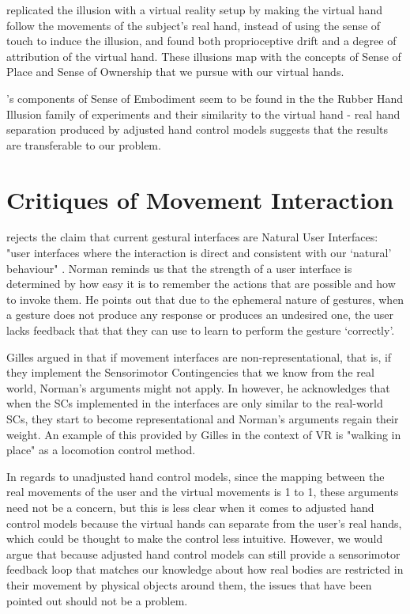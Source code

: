 \parencite{Sanchez-Vives2010} replicated the illusion with a virtual reality setup by making the virtual hand follow the movements of the subject's real hand, instead of using the sense of touch to induce the illusion, and found both proprioceptive drift and a degree of attribution of the virtual hand. These illusions map with the concepts of Sense of Place and Sense of Ownership that we pursue with our virtual hands.

\parencite{Kilteni2012}'s components of Sense of Embodiment seem to be found in the the Rubber Hand Illusion family of experiments and their similarity to the virtual hand - real hand separation produced by adjusted hand control models suggests that the results are transferable to our problem.

\section{Critiques of Movement Interaction}
\label{sec:critiquesMovementInteraction}

\parencite{Norman2010} rejects the claim that current gestural interfaces are Natural User Interfaces: "user interfaces where the interaction is direct and consistent with our ‘natural’ behaviour" \parencite{HvasMortensen2017}. Norman reminds us that the strength of a user interface is determined by how easy it is to remember the actions that are possible and how to invoke them. He points out that due to the ephemeral nature of gestures, when a gesture does not produce any response or produces an undesired one, the user lacks feedback that that they can use to learn to perform the gesture ‘correctly’.

Gilles argued in \parencite{Gillies2014} that if movement interfaces are non-representational, that is, if they implement the Sensorimotor Contingencies that we know from the real world, Norman's arguments might not apply. In \parencite{Gillies2016} however, he acknowledges that when the SCs implemented in the interfaces are only similar to the real-world SCs, they start to become representational and Norman's arguments regain their weight. An example of this provided by Gilles in the context of VR is "walking in place" as a locomotion control method.

In regards to unadjusted hand control models, since the mapping between the real movements of the user and the virtual movements is 1 to 1, these arguments need not be a concern, but this is less clear when it comes to adjusted hand control models because the virtual hands can separate from the user's real hands, which could be thought to make the control less intuitive. However, we would argue that because adjusted hand control models can still provide a sensorimotor feedback loop \parencite{Gillies2014} that matches our knowledge about how real bodies are restricted in their movement by physical objects around them, the issues that have been pointed out should not be a problem.

